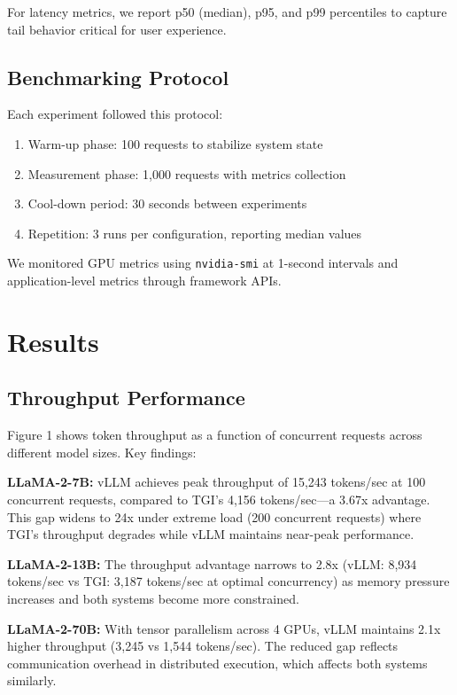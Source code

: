 \documentclass{article}
\begin{document}
For latency metrics, we report p50 (median), p95, and p99 percentiles to capture tail behavior critical for user experience.

\subsection{Benchmarking Protocol}

Each experiment followed this protocol:

\begin{enumerate}
    \item Warm-up phase: 100 requests to stabilize system state
    \item Measurement phase: 1,000 requests with metrics collection
    \item Cool-down period: 30 seconds between experiments
    \item Repetition: 3 runs per configuration, reporting median values
\end{enumerate}

We monitored GPU metrics using \texttt{nvidia-smi} at 1-second intervals and application-level metrics through framework APIs.

\section{Results}

\subsection{Throughput Performance}

Figure 1 shows token throughput as a function of concurrent requests across different model sizes. Key findings:

\textbf{LLaMA-2-7B:} vLLM achieves peak throughput of 15,243 tokens/sec at 100 concurrent requests, compared to TGI's 4,156 tokens/sec—a 3.67x advantage. This gap widens to 24x under extreme load (200 concurrent requests) where TGI's throughput degrades while vLLM maintains near-peak performance.

\textbf{LLaMA-2-13B:} The throughput advantage narrows to 2.8x (vLLM: 8,934 tokens/sec vs TGI: 3,187 tokens/sec at optimal concurrency) as memory pressure increases and both systems become more constrained.

\textbf{LLaMA-2-70B:} With tensor parallelism across 4 GPUs, vLLM maintains 2.1x higher throughput (3,245 vs 1,544 tokens/sec). The reduced gap reflects communication overhead in distributed execution, which affects both systems similarly.
\end{document}
